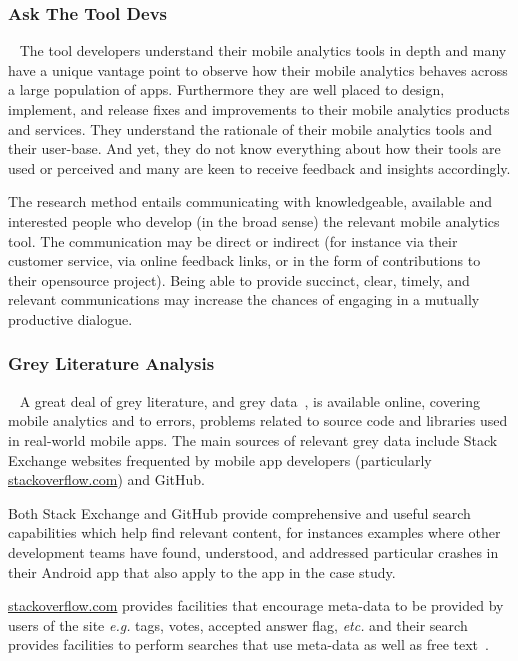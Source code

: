 \subsubsection{Ask The Tool Devs}~\label{section-ask-the-tool-devs-research-method} 
The tool developers understand their mobile analytics tools in depth and many have a unique vantage point to observe how their mobile analytics behaves across a large population of apps. Furthermore they are well placed to design, implement, and release fixes and improvements to their mobile analytics products and services. They understand the rationale of their mobile analytics tools and their user-base. And yet, they do not know everything about how their tools are used or perceived and many are keen to receive feedback and insights accordingly.

The research method entails communicating with knowledgeable, available and interested people who develop (in the broad sense) the relevant mobile analytics tool. The communication may be direct or indirect (for instance via their customer service, via online feedback links, or in the form of contributions to their opensource project). Being able to provide succinct, clear, timely, and relevant communications may increase the chances of engaging in a mutually productive dialogue.

\subsubsection{Grey Literature Analysis}~\label{section-grey-literature-analysis-research-method}   
A great deal of grey literature, and grey data~\citep[pp 219-221]{banks2010_blog_posts_and_tweets_the_next_frontier_for_grey_literature}, is available online, covering mobile analytics and to errors, problems related to source code and libraries used in real-world mobile apps. The main sources of relevant grey data include Stack Exchange websites frequented by mobile app developers (particularly \href{https://stackoverflow.com/}{stackoverflow.com}) and GitHub. 

Both Stack Exchange and GitHub provide comprehensive and useful search capabilities which help find relevant content, for instances examples where other development teams have found, understood, and addressed particular crashes in their Android app that also apply to the app in the case study.

\href{https://stackoverflow.com/}{stackoverflow.com} provides facilities that encourage meta-data to be provided by users of the site \textit{e.g.} tags, votes, accepted answer flag, \textit{etc.} and their search provides facilities to perform searches that use meta-data as well as free text~\citep{stackoverflow2021_search_help}.

